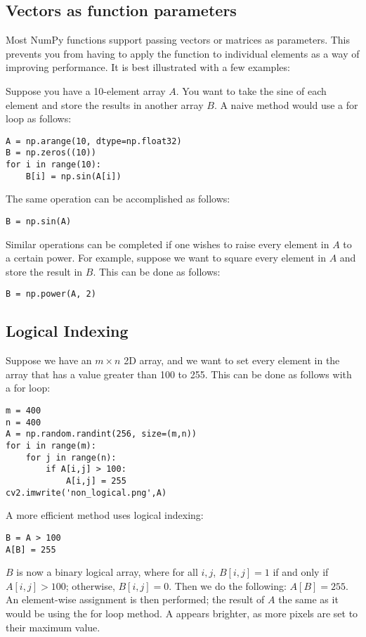 \documentclass{article}
\begin{document}
\subsection{Vectors as function parameters}
Most NumPy functions support passing vectors or matrices as parameters. This prevents you from having to apply the function to individual elements as a way of improving performance. It is best illustrated with a few examples:

Suppose you have a 10-element array $A$. You want to take the sine of each element and store the results in another array $B$. A naive method would use a for loop as follows:
\begin{lstlisting}
A = np.arange(10, dtype=np.float32)
B = np.zeros((10))
for i in range(10):
    B[i] = np.sin(A[i])
\end{lstlisting}

The same operation can be accomplished as follows:
\begin{lstlisting}
B = np.sin(A)
\end{lstlisting}
Similar operations can be completed if one wishes to raise every element in $A$ to a certain power. For example, suppose we want to square every element in $A$ and store the result in $B$. This can be done as follows:
\begin{lstlisting}
B = np.power(A, 2)
\end{lstlisting}

\subsection{Logical Indexing}

Suppose we have an $m \times n$ 2D array, and we want to set every element in the array that has a value greater than 100 to 255. This can be done as follows with a for loop:
\begin{lstlisting}
m = 400
n = 400
A = np.random.randint(256, size=(m,n))
for i in range(m):
    for j in range(n):
        if A[i,j] > 100:
            A[i,j] = 255
cv2.imwrite('non_logical.png',A)
\end{lstlisting}
A more efficient method uses logical indexing:
\begin{lstlisting}
B = A > 100
A[B] = 255
\end{lstlisting}
$B$ is now a binary logical array, where for all $i,j$, $B[i,j]=1$ if and only if $A[i,j] > 100$; otherwise, $B[i,j]=0$. Then we do the following: $A[B] = 255$. An element-wise assignment is then performed; the result of $A$ the same as it would be using the for loop method. A appears brighter, as more pixels are set to their maximum value.
\end{document}
